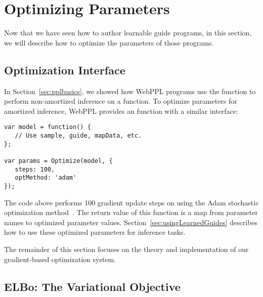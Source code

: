 \section{Optimizing Parameters}
\label{sec:optimization}

Now that we have seen how to author learnable guide programs, in this section, we will describe how to optimize the parameters of those programs. 

\subsection{Optimization Interface}

In Section~\ref{sec:pplbasics}, we showed how WebPPL programs use the  function to perform non-amortized inference on a  function. To optimize parameters for amortized inference, WebPPL provides an  function with a similar interface:
\begin{lstlisting}
var model = function() {
   // Use sample, guide, mapData, etc.
};

var params = Optimize(model, {
   steps: 100,
   optMethod: 'adam'
});
\end{lstlisting}
The code above performs 100 gradient update steps on  using the Adam stochastic optimization method~\cite{Adam}.
The return value  of this function is a map from parameter names to optimized parameter values. Section~\ref{sec:usingLearnedGuides} describes how to use these optimized parameters for inference tasks.

The remainder of this section focuses on the theory and implementation of our gradient-based optimization system. 

\subsection{ELBo: The Variational Objective}

